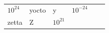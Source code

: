 {\begin{center}
\begin{xtabular*}{\mytablewidth}[t]{|p{10\mystarwidth}|p{10\mystarwidth}|p{10\mystarwidth}|p{10\mystarwidth}|p{10\mystarwidth}|p{10\mystarwidth}|}
        
                \begin{math}{10}^{24}\end{math}
               &
    
    
        yocto &
    
    
        y &
    
    
        
                \begin{math}{10}^{-24}\end{math}
     \tabularnewline{}
    
    
        zetta &
    
    
        Z &
    
    
        
                \begin{math}{10}^{21}\end{math}
               &
    
    

\end{xtabular*}
\end{center}}
